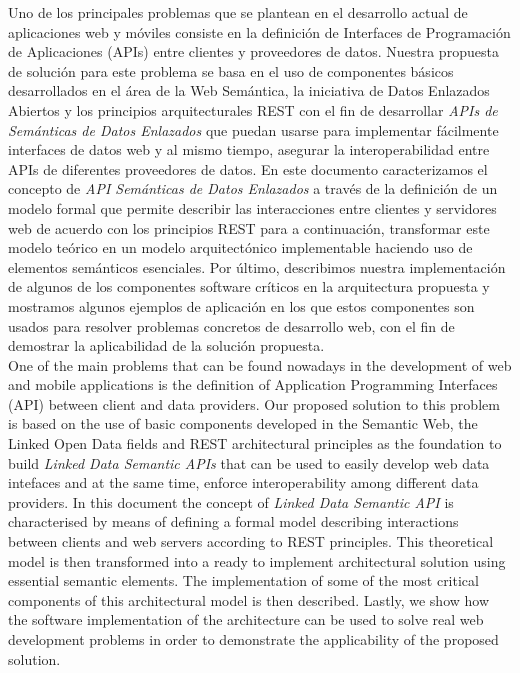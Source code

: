 % 
% 
%

Uno de los principales problemas que se plantean en el desarrollo actual de aplicaciones web y m\'oviles consiste en la definici\'on de Interfaces de Programaci\'on de Aplicaciones (APIs) entre clientes y proveedores de datos. Nuestra propuesta de soluci\'on para este problema se basa en el uso de componentes b\'asicos desarrollados en el \'area de la Web Sem\'antica, la iniciativa de Datos Enlazados Abiertos y los principios arquitecturales REST con el fin de desarrollar \textit{APIs de Sem\'anticas de Datos Enlazados} que puedan usarse para implementar f\'acilmente interfaces de datos web y al mismo tiempo, asegurar la interoperabilidad entre APIs de diferentes proveedores de datos.
En este documento caracterizamos el concepto de \textit{API Sem\'anticas de Datos Enlazados} a trav\'es de la definici\'on de un modelo formal que permite describir las interacciones entre clientes y servidores web de acuerdo con los principios REST para a continuaci\'on, transformar este modelo te\'orico en un modelo arquitect\'onico implementable haciendo uso de elementos sem\'anticos esenciales. Por \'ultimo, describimos nuestra implementaci\'on de algunos de los componentes software cr\'iticos en la arquitectura propuesta y mostramos algunos ejemplos de aplicaci\'on en los que estos componentes son usados para resolver problemas concretos de desarrollo web, con el fin de demostrar la aplicabilidad de la soluci\'on propuesta.\\

One of the main problems that can be found nowadays in the development of web and mobile applications is the definition of Application Programming Interfaces (API) between client and data providers. Our proposed solution to this problem is based on the use of basic components developed in the Semantic Web, the Linked Open Data fields and REST architectural principles as the foundation to build \textit{Linked Data Semantic APIs} that can be used to easily develop web data intefaces and at the same time, enforce interoperability among different data providers.
In this document the concept of \textit{Linked Data Semantic API} is characterised by means of defining a formal model describing interactions between clients and web servers according to REST principles. This theoretical model is then transformed into a ready to implement architectural solution using essential semantic elements. The implementation of some of the most critical components of this architectural model is then described. Lastly, we show how the software implementation of the architecture can be used to solve real web development problems in order to demonstrate the applicability of the proposed solution.

